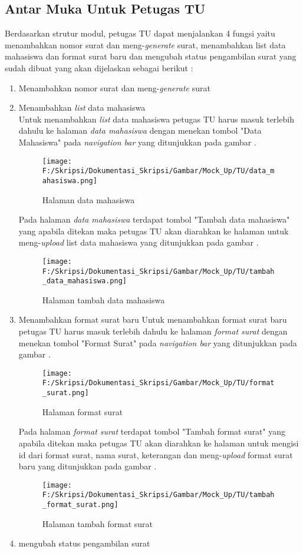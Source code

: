 \subsection{Antar Muka Untuk Petugas TU}
\label{sec:antar_muka_petugas_tu}
Berdasarkan strutur modul, petugas TU dapat menjalankan 4 fungsi yaitu menambahkan nomor surat dan meng-\textit{generate} surat, menambahkan list data mahasiswa dan format surat baru dan mengubah status pengambilan surat yang sudah dibuat yang akan dijelaskan sebagai berikut :
\begin{enumerate}
	\item Menambahkan nomor surat dan meng-\textit{generate} surat
	\item Menambahkan \textit{list} data mahasiswa\\
	Untuk menambahkan \textit{list} data mahasiswa petugas TU harus masuk terlebih dahulu ke halaman \textit{data mahasiswa} dengan menekan tombol "Data Mahasiswa" pada \textit{navigation bar} yang ditunjukkan pada gambar .
	\begin{figure}[H]
	\centering
		\texttt{[image: F:/Skripsi/Dokumentasi\_Skripsi/Gambar/Mock\_Up/TU/data\_mahasiswa.png]}
		\caption{Halaman data mahasiswa}
		\label{fig:halaman_data mahasiswa}
	\end{figure}
	Pada halaman \textit{data mahasiswa} terdapat tombol "Tambah data mahasiswa" yang apabila ditekan maka petugas TU akan diarahkan ke halaman untuk meng-\textit{upload} list data mahasiswa yang ditunjukkan pada gambar .
	\begin{figure}[H]
	\centering
		\texttt{[image: F:/Skripsi/Dokumentasi\_Skripsi/Gambar/Mock\_Up/TU/tambah\_data\_mahasiswa.png]}
		\caption{Halaman tambah data mahasiswa}
		\label{fig:halaman_tambah_data mahasiswa}
	\end{figure}
	\item Menambahkan format surat baru
	Untuk menambahkan format surat baru petugas TU harus masuk terlebih dahulu ke halaman \textit{format surat} dengan menekan tombol "Format Surat" pada \textit{navigation bar} yang ditunjukkan pada gambar .
	\begin{figure}[H]
	\centering
		\texttt{[image: F:/Skripsi/Dokumentasi\_Skripsi/Gambar/Mock\_Up/TU/format\_surat.png]}
		\caption{Halaman format surat}
		\label{fig:halaman_format_surat}
	\end{figure}
	
	Pada halaman \textit{format surat} terdapat tombol "Tambah format surat" yang apabila ditekan maka petugas TU akan diarahkan ke halaman untuk mengisi id dari format surat, nama surat, keterangan dan meng-\textit{upload} format surat baru yang ditunjukkan pada gambar .
	\begin{figure}[H]
	\centering
		\texttt{[image: F:/Skripsi/Dokumentasi\_Skripsi/Gambar/Mock\_Up/TU/tambah\_format\_surat.png]}
		\caption{Halaman tambah format surat}
		\label{fig:halaman_tambah_format_surat}
	\end{figure}
	
	\item mengubah status pengambilan surat
\end{enumerate}
